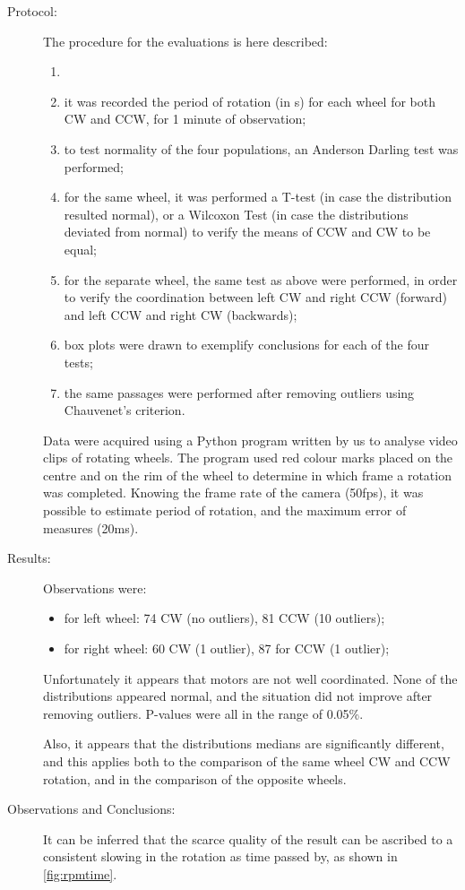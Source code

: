 \documentclass[a4paper,twoside]{book}
\begin{document}
\begin{description}
\item[Protocol:]
  The procedure for the evaluations is here described:
  \begin{enumerate}
    \item[]
    \item it was recorded the period of rotation (in s) for each wheel for both CW and CCW, for 1 minute of observation;
    \item to test normality of the four populations, an Anderson Darling test was performed;
    \item for the same wheel, it was performed a T-test (in case the distribution resulted normal), or a Wilcoxon Test (in case the distributions deviated from normal) to verify the means of CCW and CW to be equal;
    \item for the separate wheel, the same test as above were performed, in order to verify the coordination between left CW and right CCW (forward) and left CCW and right CW (backwards);
    \item box plots were drawn to exemplify conclusions for each of the four tests;
    \item the same passages were performed after removing outliers using Chauvenet's criterion.
  \end{enumerate}
  Data were acquired using a Python program written by us to analyse video clips of rotating wheels. The program used red colour marks placed on the centre and on the rim of the wheel to determine in which frame a rotation was completed. Knowing the frame rate of the camera (50fps), it was possible to estimate period of rotation, and the maximum error of measures (20ms).

\item[Results:]
  Observations were:
  \begin{itemize}
    \item for left wheel: 74 CW (no outliers), 81 CCW (10 outliers);
    \item for right wheel: 60 CW (1 outlier), 87 for CCW (1 outlier);
  \end{itemize}
  Unfortunately it appears that motors are not well coordinated. None of the distributions appeared normal, and the situation did not improve after removing outliers. P-values were all in the range of 0.05\%.

  Also, it appears that the distributions medians are significantly different, and this applies both to the comparison of the same wheel CW and CCW rotation, and in the comparison of the opposite wheels.

\item[Observations and Conclusions:]
  It can be inferred that the scarce quality of the result can be ascribed to a consistent slowing in the rotation as time passed by, as shown in
\autoref{fig:rpmtime}.
\end{description}
\afterlist*
\end{document}
